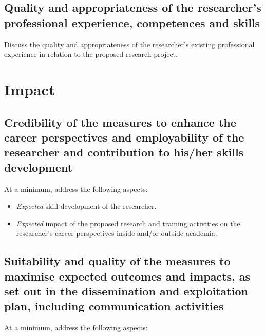 \documentclass[11pt,draftproposal]{msca-pf}
\begin{document}
\subsection{Quality and appropriateness of the researcher's professional
experience, competences and skills}

Discuss the quality and appropriateness of the researcher’s existing professional
experience in relation to the proposed research project.

\section{Impact}

\subsection{Credibility of the measures to enhance the career perspectives
and employability of the researcher and contribution to his/her skills
development}

At a minimum, address the following aspects:

\begin{itemize}
    \item \emph{Expected} skill development of the researcher.
    \item \emph{Expected} impact of the proposed research and training activities on
    the researcher's career perspectives inside and/or outside academia.
\end{itemize}

\subsection{Suitability and quality of the measures to maximise expected
outcomes and impacts, as set out in the dissemination and exploitation plan,
including communication activities}

At a minimum, address the following aspects:
\end{document}
